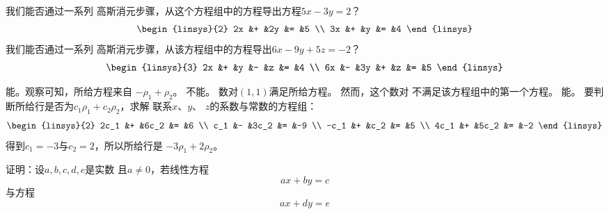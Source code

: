 \begin{exercises}
\begin{exparts}
      \partsitem 我们能否通过一系列
        高斯消元步骤，从这个方程组中的方程导出方程\( 5x-3y=2 \)？
        \begin{equation*}
          \begin{linsys}{2}
            2x  &+  &2y &=  &5  \\
            3x  &+  &y  &=  &4
          \end{linsys}
        \end{equation*}
      \partsitem 我们能否通过一系列
        高斯消元步骤，从该方程组中的方程导出\( 6x-9y+5z=-2 \)？
        \begin{equation*}
          \begin{linsys}{3}
            2x  &+  &y  &-  &z  &=  &4  \\
            6x  &-  &3y &+  &z  &=  &5
          \end{linsys}
        \end{equation*}
    \end{exparts}
    \begin{answer} 
       \begin{exparts} 
        \partsitem 能。观察可知，所给方程来自
          \( -\rho_1+\rho_2 \)。
        \partsitem 不能。
          数对\( (1,1) \)满足所给方程。
          然而，这个数对
          不满足该方程组中的第一个方程。
        \partsitem 能。
          要判断所给行是否为\( c_1\rho_1+c_2\rho_2 \)，求解
          联系$x$、$y$、
          $z$的系数与常数的方程组：
          \begin{equation*}
            \begin{linsys}{2}
               2c_1  &+  &6c_2  &=  &6  \\
                c_1  &-  &3c_2  &=  &-9 \\
               -c_1  &+  &c_2   &=  &5  \\
               4c_1  &+  &5c_2  &=  &-2 
             \end{linsys}
          \end{equation*}
          得到$c_1=-3$与$c_2=2$，所以所给行是
          \( -3\rho_1+2\rho_2 \)。
      \end{exparts}  
     \end{answer}
  \item 
    证明：设\( a,b,c,d,e \)是实数
    且\( a\neq 0 \)，若线性方程
    \begin{equation*}
       ax+by=c
    \end{equation*}
    与方程
    \begin{equation*}
       ax+dy=e
    \end{equation*}

\end{exercises}
